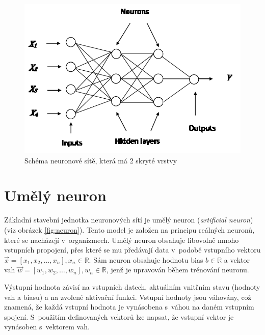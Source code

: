 \begin{figure}[H]
    \centering
    \includegraphics[scale=1.3]{obrazky-figures/mlp.png}
    \caption{\label{fig:mlp}Schéma neuronové sítě, která má 2 skryté vrstvy}
\end{figure}


\section{Umělý neuron}
Základní stavební jednotka neuronových sítí je umělý neuron (\textit{artificial neuron}) (viz obrázek \ref{fig:neuron}). Tento model je založen na principu reálných neuronů, které se nacházejí v~organizmech. Umělý neuron obsahuje libovolně mnoho vstupních propojení, přes které se mu předávají data v~podobě vstupního vektoru $\overrightarrow{x} = [x_1, x_2, \dots, x_n], x_n \in \mathbb{R}$. Sám neuron obsahuje hodnotu bias $b \in \mathbb{R}$ a vektor vah $\overrightarrow{w} = [w_1, w_2, \dots, w_n], w_n \in \mathbb{R}$, jenž je upravován během trénování neuronu.

Výstupní hodnota závisí na vstupních datech, aktuálním vnitřním stavu (hodnoty vah a biasu) a na zvolené aktivační funkci. Vstupní hodnoty jsou váhovány, což znamená, že každá vstupní hodnota je vynásobena s~váhou na daném vstupním spojení. S~použitím definovaných vektorů lze napsat, že vstupní vektor je vynásoben s~vektorem vah.

